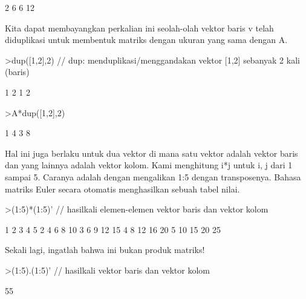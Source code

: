 \documentclass[a4paper,10pt]{article}
\begin{document}
\begin{eulernotebook}
\begin{eulercomment}
\begin{eulercomment}
\begin{eulercomment}
\begin{eulercomment}
\begin{euleroutput}
              2             6 
              6            12 
\end{euleroutput}
\begin{eulercomment}
Kita dapat membayangkan perkalian ini seolah-olah vektor baris v telah
diduplikasi untuk membentuk matriks dengan ukuran yang sama dengan A.
\end{eulercomment}
\begin{eulerprompt}
>dup([1,2],2) // dup: menduplikasi/menggandakan vektor [1,2] sebanyak 2 kali (baris)
\end{eulerprompt}
\begin{euleroutput}
              1             2 
              1             2 
\end{euleroutput}
\begin{eulerprompt}
>A*dup([1,2],2) 
\end{eulerprompt}
\begin{euleroutput}
              1             4 
              3             8 
\end{euleroutput}
\begin{eulercomment}
Hal ini juga berlaku untuk dua vektor di mana satu vektor adalah
vektor baris dan yang lainnya adalah vektor kolom. Kami menghitung i*j
untuk i, j dari 1 sampai 5. Caranya adalah dengan mengalikan 1:5
dengan transposenya. Bahasa matriks Euler secara otomatis menghasilkan
sebuah tabel nilai.
\end{eulercomment}
\begin{eulerprompt}
>(1:5)*(1:5)' // hasilkali elemen-elemen vektor baris dan vektor kolom
\end{eulerprompt}
\begin{euleroutput}
              1             2             3             4             5 
              2             4             6             8            10 
              3             6             9            12            15 
              4             8            12            16            20 
              5            10            15            20            25 
\end{euleroutput}
\begin{eulercomment}
Sekali lagi, ingatlah bahwa ini bukan produk matriks!
\end{eulercomment}
\begin{eulerprompt}
>(1:5).(1:5)' // hasilkali vektor baris dan vektor kolom
\end{eulerprompt}
\begin{euleroutput}
  55
\end{euleroutput}

\end{eulercomment}
\end{eulercomment}
\end{eulercomment}
\end{eulercomment}
\end{eulernotebook}
\end{document}
